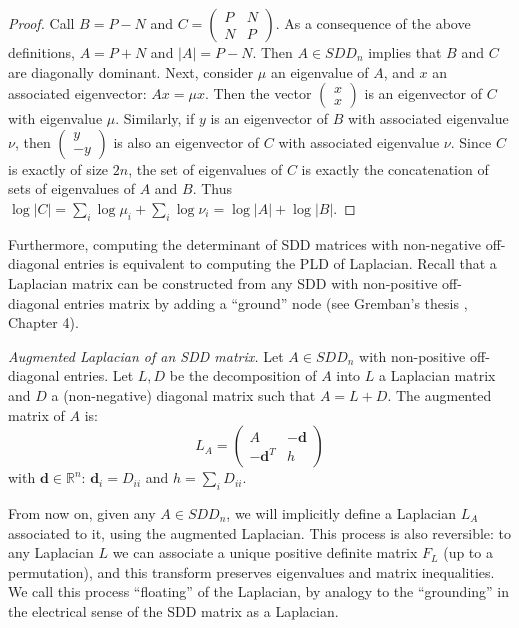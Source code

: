 \begin{proof} Call $B=P-N$ and $C=\left(\begin{array}{cc}
P & N\\
N & P
\end{array}\right)$. As a consequence of the above definitions, $A=P+N$ and $\left|A\right|=P-N$.
Then $A\in SDD_{n}$ implies that $B$ and $C$ are diagonally dominant.
Next, consider $\mu$ an eigenvalue of $A$, and $x$ an associated
eigenvector: $Ax=\mu x$. Then the vector $\left(\begin{array}{c}
x\\
x
\end{array}\right)$ is an eigenvector of $C$ with eigenvalue $\mu$. Similarly, if $y$
is an eigenvector of $B$ with associated eigenvalue $\nu$, then
$\left(\begin{array}{c}
y\\
-y
\end{array}\right)$ is also an eigenvector of $C$ with associated eigenvalue $\nu$.
Since $C$ is exactly of size $2n$, the set of eigenvalues of $C$
is exactly the concatenation of sets of eigenvalues of $A$ and $B$.
Thus $\log\left|C\right|=\sum_{i}\log\mu_{i}+\sum_{i}\log\nu_{i}=\log\left|A\right|+\log\left|B\right|$.
\end{proof}

Furthermore, computing the determinant of SDD matrices with non-negative
off-diagonal entries is equivalent to computing the PLD of Laplacian.
Recall that a Laplacian matrix can be constructed from any SDD with
non-positive off-diagonal entries matrix by adding a ``ground''
node (see Gremban's thesis \cite{Gremban1996}, Chapter 4).

\begin{definition} \emph{Augmented Laplacian of an SDD matrix.} Let
$A\in SDD_{n}$ with non-positive off-diagonal entries. Let $L,D$
be the decomposition of $A$ into $L$ a Laplacian matrix and $D$
a (non-negative) diagonal matrix such that $A=L+D$. The augmented
matrix of $A$ is: 
\[
L_{A}=\left(\begin{array}{cc}
A & -\mathbf{d}\\
-\mathbf{d}^{T} & h
\end{array}\right)
\]
with $\mathbf{d}\in\mathbb{R}^{n}$: $\mathbf{d}_{i}=D_{ii}$ and
$h=\sum_{i}D_{ii}$. \end{definition}

From now on, given any $A\in SDD_{n}$, we will implicitly define
a Laplacian $L_{A}$ associated to it, using the augmented Laplacian.
This process is also reversible: to any Laplacian $L$ we can associate
a unique positive definite matrix $F_{L}$ (up to a permutation),
and this transform preserves eigenvalues and matrix inequalities.
We call this process ``floating'' of the Laplacian, by analogy to
the ``grounding'' in the electrical sense of the SDD matrix as a
Laplacian.

